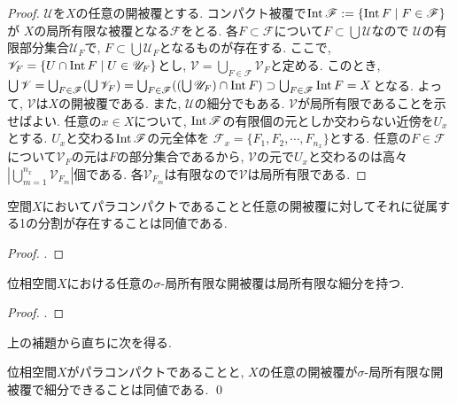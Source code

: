 \documentclass[uplatex, dvipdfmx, a4paper, 12pt, class=jsbook, crop=false]{standalone}
\begin{document}
\begin{proof}
	$ \mathscr{U} $を$ X $の任意の開被覆とする.
	コンパクト被覆で$\topint\mathscr{F} \defeq \setcomp{\topint F}{F \in \mathscr{F}}$が
	$ X $の局所有限な被覆となる$ \mathscr{F} $をとる.
	各$ F \subset \mathscr{F} $について$ F \subset \bigcup \mathscr{U} $なので
	$ \mathscr{U} $の有限部分集合$ \mathscr{U}_F  $で, $ F \subset \bigcup \mathscr{U}_F $となるものが存在する.
	ここで, $ \mathscr{V}_F = \setcomp{U \cap \topint F}{U \in \mathscr{U}_F}$とし,
	$ \mathscr{V} = \bigcup_{F \in \mathscr{F}} \mathscr{V}_F $と定める.
	このとき, $ \bigcup \mathscr{V}=\bigcup_{F\in\mathscr{F}}(\bigcup \mathscr{V}_F)
	= \bigcup_{F\in \mathscr{F}}((\bigcup \mathscr{U}_F) \cap \mathop{\mathrm{Int}}\nolimits F) \supset \bigcup_{F\in\mathscr{F}}\mathop{\mathrm{Int}}\nolimits F = X $となる.
	よって, $ \mathscr{V} $は$ X $の開被覆である.
	また, $ \mathscr{U} $の細分でもある. $ \mathscr{V} $が局所有限であることを示せばよい.
	任意の$ x \in X $について, $ \mathop{\mathrm{Int}}\nolimits \mathscr{F} $の有限個の元としか交わらない近傍を$U_x$とする.
	$ U_x $と交わる$ \mathop{\mathrm{Int}}\nolimits \mathscr{F} $の元全体を
	$ \mathscr{F}_x = \{F_{1}, F_{2} ,\cdots, F_{n_x}\} $とする.
	任意の$ F \in \mathscr{F} $について$ \mathscr{V}_F $の元は$ F $の部分集合であるから,
	$ \mathscr{V} $の元で$ U_x $と交わるのは高々$ |\bigcup_{m=1}^{n_x} \mathscr{V}_{F_m}| $個である.
	各$ \mathscr{V}_{F_m} $は有限なので$ \mathscr{V} $は局所有限である.
\end{proof}

\begin{proposition}
	\Hausdorff 空間$ X $においてパラコンパクトであることと任意の開被覆に対してそれに従属する1の分割が存在することは同値である.
\end{proposition}

\begin{proof}
	\WIP.
\end{proof}

\begin{lemma}
	位相空間$ X $における任意の$\sigma$-局所有限な開被覆は局所有限な細分を持つ.
\end{lemma}

\begin{proof}
	\WIP.
\end{proof}

上の補題から直ちに次を得る.
\begin{proposition}
	位相空間$ X $がパラコンパクトであることと,
	$ X $の任意の開被覆が$\sigma$-局所有限な開被覆で細分できることは同値である.
	\qed
\end{proposition}
\end{document}
